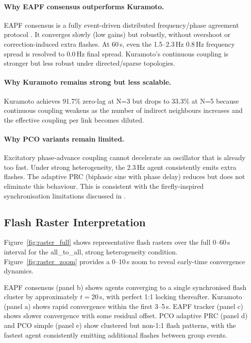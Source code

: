 \documentclass[11pt,a4paper]{article}
\begin{document}
\paragraph{Why EAPF consensus outperforms Kuramoto.}
EAPF consensus is a fully event-driven distributed frequency/phase agreement
protocol \cite{gardner2005phaselock,olfati2007consensus}.  It converges slowly
(low gains) but robustly, without overshoot or correction-induced extra
flashes.  At 60\,s, even the 1.5--2.3\,Hz 0.8\,Hz frequency spread is
resolved to 0.0\,Hz final spread.  Kuramoto's continuous coupling is stronger
but less robust under directed/sparse topologies.

\paragraph{Why Kuramoto remains strong but less scalable.}
Kuramoto \cite{kuramoto1975self} achieves 91.7\% zero-lag at N=3 but drops to
33.3\% at N=5 because continuous coupling weakens as the number of indirect
neighbours increases and the effective coupling per link becomes diluted.

\paragraph{Why PCO variants remain limited.}
Excitatory phase-advance coupling \cite{mirollo1990synchronization} cannot
decelerate an oscillator that is already too fast.  Under strong heterogeneity,
the 2.3\,Hz agent consistently emits extra flashes.  The adaptive PRC
(biphasic sine with phase delay) reduces but does not eliminate this
behaviour.  This is consistent with the firefly-inspired synchronisation
limitations discussed in \cite{tyrrell2006fireflies}.

\subsection{Flash Raster Interpretation}

Figure~\ref{fig:raster_full} shows representative flash rasters over the full
0--60\,s interval for the all\_to\_all, strong heterogeneity condition.
Figure~\ref{fig:raster_zoom} provides a 0--10\,s zoom to reveal early-time
convergence dynamics.

EAPF consensus (panel b) shows agents converging to a single synchronised
flash cluster by approximately $t = 20$\,s, with perfect 1:1 locking
thereafter.  Kuramoto (panel a) shows rapid convergence within the first
3--5\,s.  EAPF tracker (panel c) shows slower convergence with some residual
offset.  PCO adaptive PRC (panel d) and PCO simple (panel e) show clustered
but non-1:1 flash patterns, with the fastest agent consistently emitting
additional flashes between group events.
\end{document}
